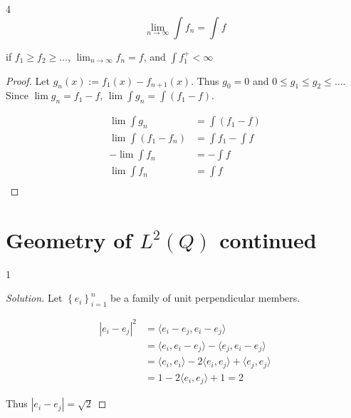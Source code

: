 \documentclass{article}
\newcommand{\abs}[1]{\left\lvert #1\right\rvert}
\newcommand{\angles}[1]{\langle #1 \rangle}
\newenvironment{solution}
{\renewcommand\qedsymbol{$\blacksquare$}\begin{proof}[Solution]}
{\end{proof}}
\begin{document}
\bigskip

\begin{claim}{4}\label{Claim 4.}
    \[
        \lim_{n \to \infty} \int f_n = \int f
    \]

    if $f_1 \geq f_2 \geq \dots$, $\lim_{n \to \infty} f_n = f$, and $\int f_1^+ < \infty$   
\end{claim}
\begin{proof}
    Let $g_n(x) := f_{1}(x) - f_{n + 1}(x)$. Thus $g_0 = 0$ and $0 \leq g_1 \leq g_2 \leq \dots$. Since $\lim g_n = f_1 - f$, $\lim \int g_n = \int (f_1 - f)$. 

    \begin{align*}
        \lim \int g_n &= \int (f_1 - f) \\
        \lim \int \left(f_1 - f_n\right) &= \int f_1 - \int f \\
        -\lim \int f_n  &= - \int f \\
        \lim \int f_n  &= \int f \\
    \end{align*}
\end{proof}

\pagebreak

\section{Geometry of $L^2(Q)$ continued}
\begin{PROB}{1}\label{Problem 1.}
\end{PROB}
\begin{solution}
    Let $\left\{ e_i \right\}_{i = 1}^n$ be a family of unit perpendicular members. 
    
    \begin{align*}
        \abs{e_i - e_j}^2 &= \angles{e_i - e_j, e_i - e_j} \\
        &= \angles{e_i, e_i - e_j} - \angles{e_j, e_i - e_j} \\
        &= \angles{e_i, e_i} - 2\angles{e_i, e_j} + \angles{e_j, e_j} \\
        &= 1 - 2\angles{e_i, e_j} + 1 = 2
    \end{align*}

    Thus $\abs{e_i - e_j} = \sqrt{2}$ 
\end{solution}

\bigskip
\end{document}
